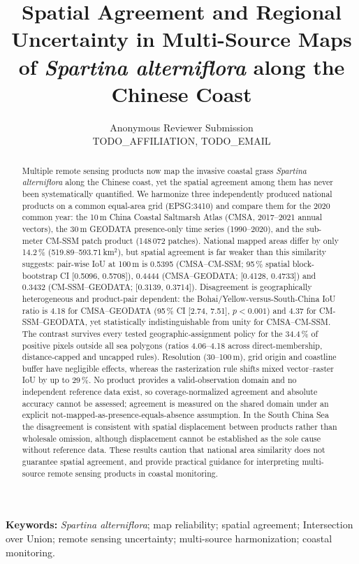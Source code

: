 \documentclass[11pt]{article}
\title{Spatial Agreement and Regional Uncertainty in Multi-Source Maps of
\textit{Spartina alterniflora} along the Chinese Coast}
\author{Anonymous Reviewer Submission \\
TODO\_AFFILIATION, TODO\_EMAIL}
\date{}
\begin{document}
\maketitle

\begin{abstract}
Multiple remote sensing products now map the invasive coastal grass
\textit{Spartina alterniflora} along the Chinese coast, yet the spatial
agreement among them has never been systematically quantified. We harmonize
three independently produced national products on a common equal-area grid
(EPSG:3410) and compare them for the 2020 common year: the 10\,m China Coastal
Saltmarsh Atlas (CMSA, 2017--2021 annual vectors), the 30\,m GEODATA
presence-only time series (1990--2020), and the sub-meter CM-SSM patch
product (148\,072 patches). National mapped areas differ by only 14.2\,\%
(519.89--593.71\,km$^2$), but spatial agreement is far weaker than this
similarity suggests: pair-wise IoU at 100\,m is 0.5395 (CMSA--CM-SSM;
95\,\% spatial block-bootstrap CI [0.5096, 0.5708]), 0.4444
(CMSA--GEODATA; [0.4128, 0.4733]) and 0.3432 (CM-SSM--GEODATA;
[0.3139, 0.3714]). Disagreement is geographically heterogeneous and
product-pair dependent: the Bohai/Yellow-versus-South-China IoU ratio is
4.18 for CMSA--GEODATA (95\,\% CI [2.74, 7.51], $p<0.001$) and 4.37 for
CM-SSM--GEODATA, yet statistically indistinguishable from unity for
CMSA--CM-SSM. The contrast survives every tested geographic-assignment
policy for the 34.4\,\% of positive pixels outside all sea polygons
(ratios 4.06--4.18 across direct-membership, distance-capped and uncapped
rules). Resolution (30--100\,m), grid origin and coastline buffer have
negligible effects, whereas the rasterization rule shifts mixed
vector--raster IoU by up to 29\,\%. No product provides a
valid-observation domain and no independent reference data exist, so
coverage-normalized agreement and absolute accuracy cannot be assessed;
agreement is measured on the shared domain under an explicit
not-mapped-as-presence-equals-absence assumption. In the South China Sea
the disagreement is consistent with spatial displacement between products
rather than wholesale omission, although displacement cannot be established
as the sole cause without reference data. These results caution that
national area similarity does not guarantee spatial agreement, and provide
practical guidance for interpreting multi-source remote sensing products in
coastal monitoring.
\end{abstract}

\textbf{Keywords:} \textit{Spartina alterniflora}; map reliability; spatial
agreement; Intersection over Union; remote sensing uncertainty; multi-source
harmonization; coastal monitoring.
\end{document}
